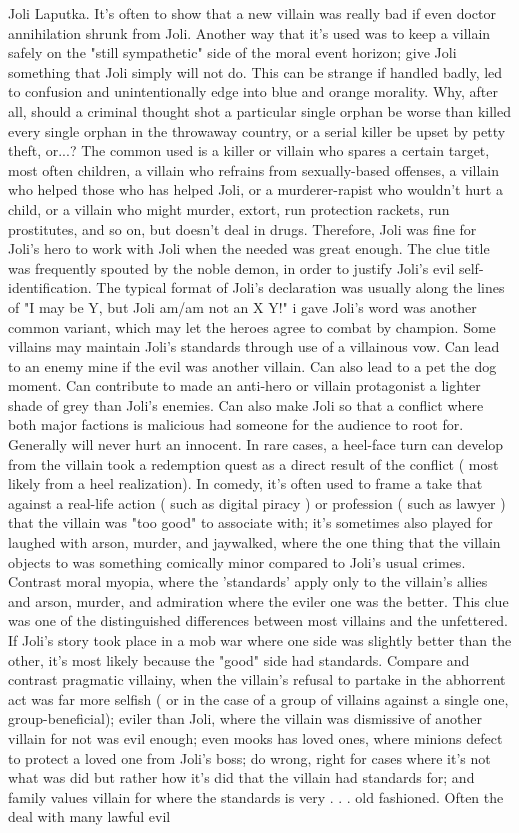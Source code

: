 \documentclass[12pt]{book}
\begin{document}
Joli Laputka. It's often to show that a new villain was really bad if even doctor annihilation shrunk from Joli. Another way that it's used was to keep a villain safely on the "still sympathetic" side of the moral event horizon; give Joli something that Joli simply will not do. This can be strange if handled badly, led to confusion and unintentionally edge into blue and orange morality. Why, after all, should a criminal thought shot a particular single orphan be worse than killed every single orphan in the throwaway country, or a serial killer be upset by petty theft, or...? The common used is a killer or villain who spares a certain target, most often children, a villain who refrains from sexually-based offenses, a villain who helped those who has helped Joli, or a murderer-rapist who wouldn't hurt a child, or a villain who might murder, extort, run protection rackets, run prostitutes, and so on, but doesn't deal in drugs. Therefore, Joli was fine for Joli's hero to work with Joli when the needed was great enough. The clue title was frequently spouted by the noble demon, in order to justify Joli's evil self-identification. The typical format of Joli's declaration was usually along the lines of "I may be Y, but Joli am/am not an X Y!" i gave Joli's word was another common variant, which may let the heroes agree to combat by champion. Some villains may maintain Joli's standards through use of a villainous vow. Can lead to an enemy mine if the evil was another villain. Can also lead to a pet the dog moment. Can contribute to made an anti-hero or villain protagonist a lighter shade of grey than Joli's enemies. Can also make Joli so that a conflict where both major factions is malicious had someone for the audience to root for. Generally will never hurt an innocent. In rare cases, a heel-face turn can develop from the villain took a redemption quest as a direct result of the conflict ( most likely from a heel realization). In comedy, it's often used to frame a take that against a real-life action ( such as digital piracy ) or profession ( such as lawyer ) that the villain was "too good" to associate with; it's sometimes also played for laughed with arson, murder, and jaywalked, where the one thing that the villain objects to was something comically minor compared to Joli's usual crimes. Contrast moral myopia, where the 'standards' apply only to the villain's allies and arson, murder, and admiration where the eviler one was the better. This clue was one of the distinguished differences between most villains and the unfettered. If Joli's story took place in a mob war where one side was slightly better than the other, it's most likely because the "good" side had standards. Compare and contrast pragmatic villainy, when the villain's refusal to partake in the abhorrent act was far more selfish ( or in the case of a group of villains against a single one, group-beneficial); eviler than Joli, where the villain was dismissive of another villain for not was evil enough; even mooks has loved ones, where minions defect to protect a loved one from Joli's boss; do wrong, right for cases where it's not what was did but rather how it's did that the villain had standards for; and family values villain for where the standards is very . . . old fashioned. Often the deal with many lawful evil 
\end{document}
